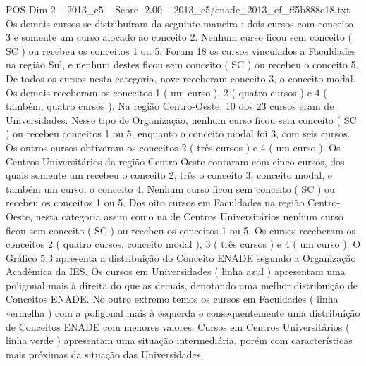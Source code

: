 \begin{textsample}{POS Dim 2 – 2013\_c5 – Score -2.00 – 2013\_c5/enade\_2013\_ef\_ff5b888e18.txt}
Os demais cursos se distribuíram da seguinte maneira : dois cursos com conceito 3 e somente um curso alocado ao conceito 2.
Nenhum curso ficou sem conceito ( SC ) ou recebeu os conceitos 1 ou 5.
Foram 18 os cursos vinculados a Faculdades na região Sul, e nenhum destes ficou sem conceito ( SC ) ou recebeu o conceito 5.
De todos os cursos nesta categoria, nove receberam conceito 3, o conceito modal.
Os demais receberam os conceitos 1 ( um curso ), 2 ( quatro cursos ) e 4 ( também, quatro cursos ).
Na região Centro-Oeste, 10 dos 23 cursos eram de Universidades.
Nesse tipo de Organização, nenhum curso ficou sem conceito ( SC ) ou recebeu conceitos 1 ou 5, enquanto o conceito modal foi 3, com seis cursos.
Os outros cursos obtiveram os conceitos 2 ( três cursos ) e 4 ( um curso ).
Os Centros Universitários da região Centro-Oeste contaram com cinco cursos, dos quais somente um recebeu o conceito 2, três o conceito 3, conceito modal, e também um curso, o conceito 4.
Nenhum curso ficou sem conceito ( SC ) ou recebeu os conceitos 1 ou 5.
Dos oito cursos em Faculdades na região Centro-Oeste, nesta categoria assim como na de Centros Universitários nenhum curso ficou sem conceito ( SC ) ou recebeu os conceitos 1 ou 5.
Os cursos receberam os conceitos 2 ( quatro cursos, conceito modal ), 3 ( três cursos ) e 4 ( um curso ).
O Gráfico 5.3 apresenta a distribuição do Conceito ENADE segundo a Organização Acadêmica da IES.
Os cursos em Universidades ( linha azul ) apresentam uma poligonal mais à direita do que as demais, denotando uma melhor distribuição de Conceitos ENADE.
No outro extremo temos os cursos em Faculdades ( linha vermelha ) com a poligonal mais à esquerda e consequentemente uma distribuição de Conceitos ENADE com menores valores.
Cursos em Centros Universitários ( linha verde ) apresentam uma situação intermediária, porém com características mais próximas da situação das Universidades.

\end{textsample}
